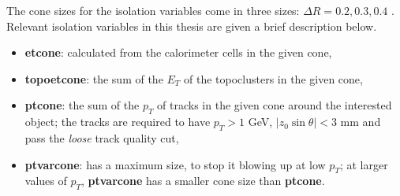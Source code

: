 The cone sizes for the isolation variables come in three sizes: $\Delta R = 0.2, 0.3, 0.4$ . Relevant isolation variables in this thesis are given a brief description below.
\begin{itemize}
\item \textbf{etcone}: calculated from the calorimeter cells in the given cone,
\item \textbf{topoetcone}: the sum of the $E_{T}$ of the topoclusters in the given cone,
\item \textbf{ptcone}: the sum of the $p_{T}$ of tracks in the given cone around the interested object; the tracks are required to have $p_{T} > 1$ GeV, $|z_{0} \sin \theta | < 3$ mm and pass the \textit{loose} track quality cut,
\item \textbf{ptvarcone}: has a maximum size, to stop it blowing up at low $p_{T}$; at larger values of $p_{T}$, \textbf{ptvarcone} has a smaller cone size than \textbf{ptcone}.
\end{itemize}